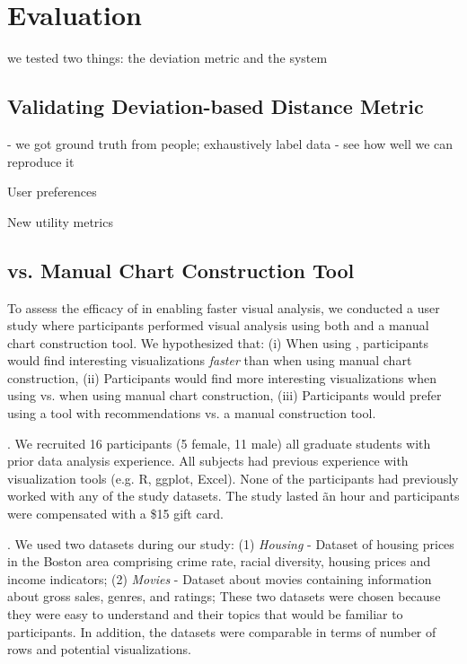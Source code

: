 
\section{Evaluation}
\label{sec:user_study}

we tested two things: the deviation metric
and the system

\subsection{Validating Deviation-based Distance Metric}
\label{sec:validating_metric}

- we got ground truth from people; exhaustively label data
- see how well we can reproduce it

User preferences

New utility metrics

\subsection{\SeeDB vs. Manual Chart Construction Tool}
\label{sec:seedb_vs_manual}

To assess the efficacy of \SeeDB in enabling faster visual analysis,
we conducted a user study where participants performed visual analysis
using both \SeeDB and a manual chart construction tool.
We hypothesized that: (i) When using \SeeDB, participants would find 
interesting visualizations {\em faster} than when using manual chart
construction, (ii) Participants would find more interesting visualizations
when using \SeeDB vs. when using manual chart construction, (iii) 
Participants would prefer using a tool with recommendations vs. a manual
construction tool.

. We recruited 16 participants (5 female, 11
 male) all graduate students with prior data analysis experience.
 All subjects had previous experience with visualization tools (e.g.
 R, ggplot, Excel).
 None of the participants had previously worked with any of the study datasets.
 The study lasted \~an hour and participants were compensated with a \$15
 gift card.

 . We used two datasets during our study:
 (1) {\em Housing} - Dataset of housing prices in
 the Boston area comprising crime rate, racial diversity, housing prices and
 income indicators; 
 (2) {\em Movies} - Dataset about movies containing information about gross
 sales, genres, and ratings;
 These two datasets were chosen because they were easy to understand and 
 their topics that would be familiar to participants. 
 In addition, the datasets were comparable in terms of number of rows and 
 potential visualizations.

